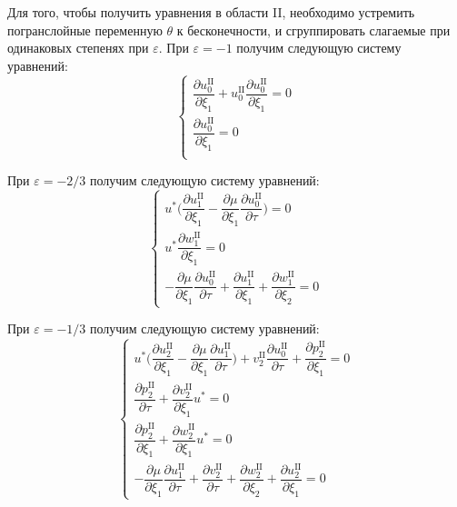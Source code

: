 \documentclass[../master.tex]{subfiles}
\begin{document}
Для того, чтобы получить уравнения в области II, необходимо устремить погранслойные переменную $\theta$ к бесконечности, и сгруппировать слагаемые при одинаковых степенях при $\varepsilon$. 
При $\varepsilon=-1$ получим следующую систему уравнений:
\begin{equation}
	\begin{cases}
	\dfrac{\partial u_0^{\text{II}}}{\partial \xi_1} + u_0^{\text{II}}\dfrac{\partial u_0^{\text{II}}}{\partial \xi_1} = 0 \\[2ex]
	\dfrac{\partial u_0^{\text{II}}}{\partial \xi_1} = 0 \\[2ex]
	\end{cases}
\end{equation}

При $\varepsilon=-2/3$ получим следующую систему уравнений:
\begin{equation}
	\begin{cases}
	u^*\bigg(\dfrac{\partial u_1^{\text{II}}}{\partial \xi_1} - \dfrac{\partial \mu}{\partial \xi_1} \dfrac{\partial u_0^{\text{II}}}{\partial \tau} \bigg) = 0 \\[2ex]
	u^* \dfrac{\partial w_1^{\text{II}}}{\partial \xi_1} = 0 \\[2ex]
	- \dfrac{\partial \mu}{\partial \xi_1} \dfrac{\partial u_0^{\text{II}}}{\partial \tau} + \dfrac{\partial u_1^{\text{II}}}{\partial \xi_1} + \dfrac{\partial w_1^{\text{II}}}{\partial \xi_2} = 0
	\end{cases}
\end{equation}

При $\varepsilon=-1/3$ получим следующую систему уравнений:
\begin{equation}
	\begin{cases}
		u^*\bigg(\dfrac{\partial u_2^{\text{II}}}{\partial \xi_1} - \dfrac{\partial \mu}{\partial \xi_1} \dfrac{\partial u_1^{\text{II}}}{\partial \tau} \bigg)  + v_2^{\text{II}}\dfrac{\partial u_0^{\text{II}}}{\partial \tau} + \dfrac{\partial p_2^{\text{II}}}{\partial \xi_1}= 0 \\[2ex]
		\dfrac{\partial p_2^{\text{II}}}{\partial \tau} + \dfrac{\partial v_2^{\text{II}}}{\partial \xi_1}u^* = 0  \\[2ex]
		\dfrac{\partial p_2^{\text{II}}}{\partial \xi_1} + \dfrac{\partial w_2^{\text{II}}}{\partial \xi_1}u^* = 0 \\[2ex]
		-\dfrac{\partial \mu}{\partial \xi_1} \dfrac{\partial u_1^{\text{II}}}{\partial \tau} +  \dfrac{\partial v_2^{\text{II}}}{\partial \tau} + \dfrac{\partial w_2^{\text{II}}}{\partial \xi_2} +  \dfrac{\partial u_2^{\text{II}}}{\partial \xi_1} = 0
	\end{cases}
\end{equation}
\end{document}
